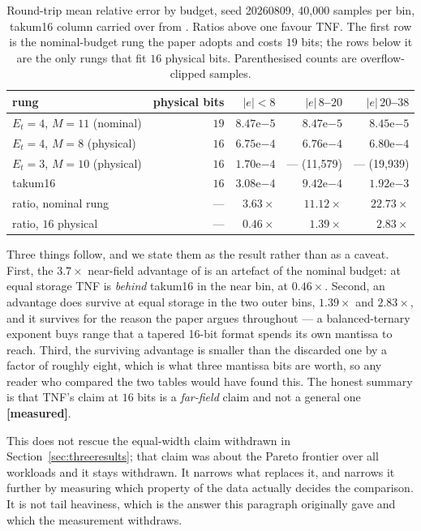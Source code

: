\begin{table}[t]\centering
\caption{Round-trip mean relative error by budget, seed 20260809, 40{,}000 samples
per bin, takum16 column carried over from . Ratios above one
favour TNF. The first row is the nominal-budget rung the paper adopts and costs
$19$ bits; the rows below it are the only rungs that fit $16$ physical bits.
Parenthesised counts are overflow-clipped samples.}
\label{tab:accphys}
\small
\begin{tabular}{lrrrr}
\toprule
rung & physical bits & $|e|<8$ & $|e|\,8$--$20$ & $|e|\,20$--$38$ \\
\midrule
$E_t{=}4$, $M{=}11$ (nominal)   & $19$ & $8.47\mathrm{e}{-5}$ & $8.47\mathrm{e}{-5}$ & $8.45\mathrm{e}{-5}$ \\
$E_t{=}4$, $M{=}8$  (physical)  & $16$ & $6.75\mathrm{e}{-4}$ & $6.76\mathrm{e}{-4}$ & $6.80\mathrm{e}{-4}$ \\
$E_t{=}3$, $M{=}10$ (physical)  & $16$ & $1.70\mathrm{e}{-4}$ & --- (11{,}579) & --- (19{,}939) \\
takum16                         & $16$ & $3.08\mathrm{e}{-4}$ & $9.42\mathrm{e}{-4}$ & $1.92\mathrm{e}{-3}$ \\
\midrule
ratio, nominal rung  & --- & $\mathbf{3.63\times}$ & $\mathbf{11.12\times}$ & $\mathbf{22.73\times}$ \\
ratio, $16$ physical & --- & $0.46\times$ & $1.39\times$ & $2.83\times$ \\
\bottomrule
\end{tabular}
\end{table}

Three things follow, and we state them as the result rather than as a caveat.
First, the $3.7\times$ near-field advantage of  is an artefact
of the nominal budget: at equal storage TNF is \emph{behind} takum16 in the near
bin, at $0.46\times$. Second, an advantage does survive at equal storage in the two
outer bins, $1.39\times$ and $2.83\times$, and it survives for the reason the paper
argues throughout --- a balanced-ternary exponent buys range that a tapered
16-bit format spends its own mantissa to reach. Third, the surviving advantage is
smaller than the discarded one by a factor of roughly eight, which is what three
mantissa bits are worth, so any reader who compared the two tables would have
found this. The honest summary is that TNF's claim at $16$ bits is a
\emph{far-field} claim and not a general one \textbf{[measured]}.

This does not rescue the equal-width claim withdrawn in Section~\ref{sec:threeresults};
that claim was about the Pareto frontier over all workloads and it stays withdrawn.
It narrows what replaces it, and  narrows it further by
measuring which property of the data actually decides the comparison. It is not
tail heaviness, which is the answer this paragraph originally gave and which the
measurement withdraws.



